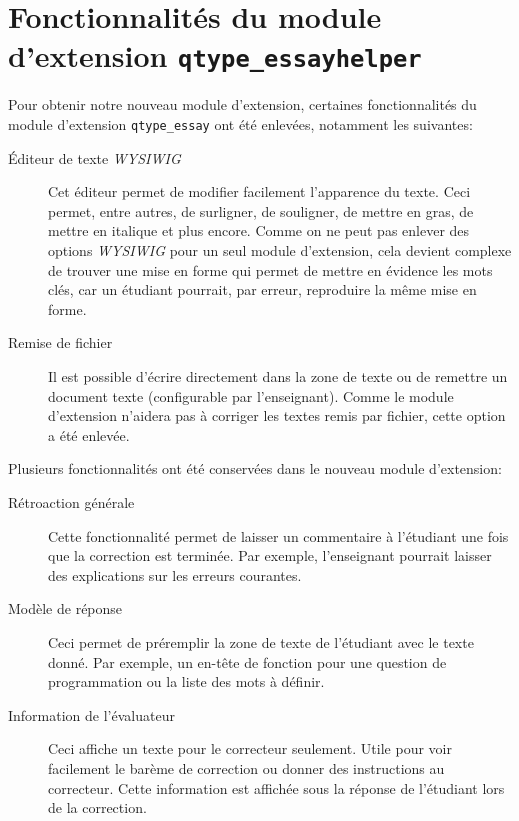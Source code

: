 \section{Fonctionnalit\'es du module d'extension \texttt{qtype\_essayhelper}}
Pour obtenir notre nouveau module d'extension,
certaines fonctionnalit\'es du module d'extension \texttt{qtype\_essay} ont \'et\'e enlev\'ees, notamment les suivantes:
\begin{description}
  \item[\'Editeur de texte \textit{WYSIWIG}]
  
  Cet \'editeur permet de modifier facilement l'apparence du texte.
  Ceci permet, entre autres, de surligner, de souligner, de mettre en gras, de mettre en italique et plus encore.
  Comme on ne peut pas enlever des options \textit{WYSIWIG} pour un seul module d'extension, cela devient complexe de trouver une mise en forme qui permet de mettre en \'evidence les mots cl\'es, car un \'etudiant pourrait, par erreur, reproduire la m\^eme mise en forme.
  
  \item[Remise de fichier]
  
  Il est possible d'\'ecrire directement dans la zone de texte ou de remettre un document texte (configurable par l'enseignant).
  Comme le module d'extension n'aidera pas \`a corriger les textes remis par fichier, cette option a \'et\'e enlev\'ee.
\end{description}
Plusieurs fonctionnalit\'es ont \'et\'e conserv\'ees dans le nouveau module d'extension:
\begin{description}
  \item[R\'etroaction g\'en\'erale]
  
  Cette fonctionnalit\'e permet de laisser un commentaire \`a l'\'etudiant une fois que la correction est termin\'ee.
  Par exemple, l'enseignant pourrait laisser des explications sur les erreurs courantes.
  
  \item[Mod\`ele de r\'eponse]
  
  Ceci permet de pr\'eremplir la zone de texte de l'\'etudiant avec le texte donn\'e.
  Par exemple, un en-t\^ete de fonction pour une question de programmation ou la liste des mots \`a d\'efinir.
  
  \item[Information de l'\'evaluateur]
  
  Ceci affiche un texte pour le correcteur seulement.
  Utile pour voir facilement le bar\`eme de correction ou donner des instructions au correcteur.
  Cette information est affich\'ee sous la r\'eponse de l'\'etudiant lors de la correction.
\end{description}
